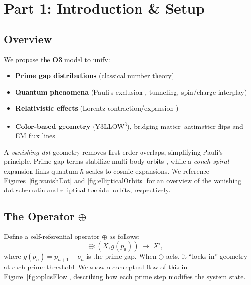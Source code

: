 \documentclass[11pt]{article}
\begin{document}
\clearpage

\section{Part 1: Introduction \& Setup}
\label{part1}

\subsection{Overview}
We propose the \textbf{O3} model to unify:

\begin{itemize}
    \item \textbf{Prime gap distributions} (classical number theory)
    \item \textbf{Quantum phenomena} (Pauli’s exclusion \cite{Pauli1925}, tunneling, spin/charge interplay)
    \item \textbf{Relativistic effects} (Lorentz contraction/expansion \cite{Lorentz1904})
    \item \textbf{Color-based geometry} (Y3LLOW\textsuperscript{3}), bridging matter--antimatter flips and EM flux lines
\end{itemize}

A \textit{vanishing dot} geometry removes first-order overlaps, simplifying Pauli’s principle. Prime gap terms stabilize multi-body orbits \cite{Poincare1892}, while a \textit{conch spiral} expansion links quantum $\hbar$ scales to cosmic expansions. We reference Figures~\ref{fig:vanishDot} and \ref{fig:ellipticalOrbits} for an overview of the vanishing dot schematic and elliptical toroidal orbits, respectively.

\subsection{The Operator \texorpdfstring{$\oplus$}{\oplus}}
Define a self-referential operator \(\oplus\) as follows:
\[
\oplus: (X, g(p_n)) \;\mapsto\; X',
\]
where \(g(p_n) = p_{n+1} - p_n\) is the prime gap. When \(\oplus\) acts, it “locks in” geometry at each prime threshold. We show a conceptual flow of this in Figure~\ref{fig:oplusFlow}, describing how each prime step modifies the system state.

\clearpage

\end{document}
